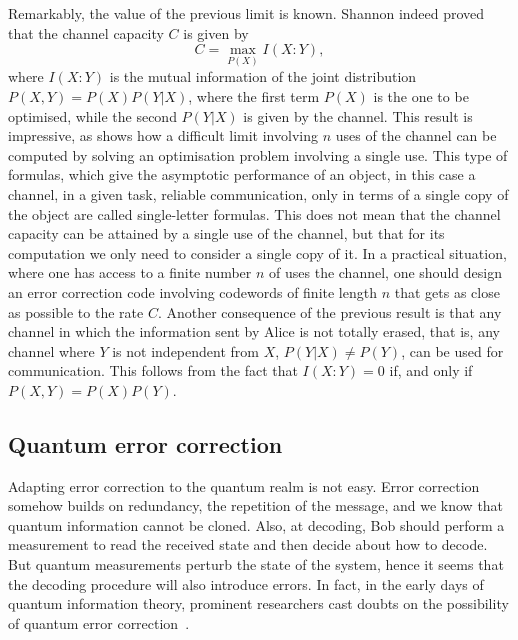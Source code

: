 \documentclass[a4paper]{article}
\begin{document}
Remarkably, the value of the previous limit is known. Shannon indeed proved that the channel capacity $C$ is given by
\begin{equation}
\label{shannoncapacity}
C=\max_{P(X)} I(X:Y) ,
\end{equation}
where $I(X:Y)$ is the mutual information of the joint distribution $P(X,Y)=P(X)P(Y|X)$, where the first term $P(X)$ is the one to be optimised, while the second $P(Y|X)$ is given by the channel. This result is impressive, as shows how a difficult limit involving $n$ uses of the channel can be computed by solving an optimisation problem involving a single use. This type of formulas, which give the asymptotic performance of an object, in this case a channel, in a given task, reliable communication, only in terms of a single copy of the object are called single-letter formulas. This does not mean that the channel capacity can be attained by a single use of the channel, but that for its computation we only need to consider a single copy of it. In a practical situation, where one has access to a finite number $n$ of uses the channel, one should design an error correction code involving codewords of finite length $n$ that gets as close as possible to the rate $C$. Another consequence of the previous result is that any channel in which the information sent by Alice is not totally erased, that is, any channel where $Y$ is not independent from $X$, $P(Y|X)\neq P(Y)$, can be used for communication. This follows from the fact that $I(X:Y)=0$ if, and only if $P(X,Y)=P(X)P(Y)$.

\subsection{Quantum error correction}

Adapting error correction to the quantum realm is not easy. Error correction somehow builds on redundancy, the repetition of the message, and we know that quantum information cannot be cloned. Also, at decoding, Bob should perform a measurement to read the received state and then decide about how to decode. But quantum measurements perturb the state of the system, hence it seems that the decoding procedure will also introduce errors. In fact, in the early days of quantum information theory, prominent researchers cast doubts on the possibility of quantum error correction~\cite{haroche}.
\end{document}
